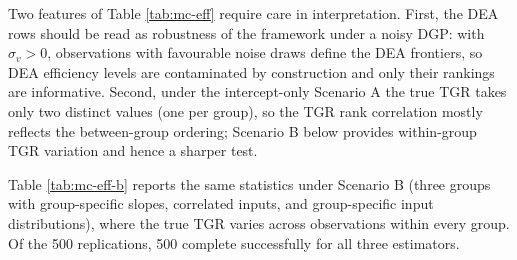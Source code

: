 \begin{table}
\centering
\caption{\label{tab:mc-eff}Efficiency recovery under Scenario A (means over 500 replications). TE is efficiency against the own-group frontier, TE* against the metafrontier, and TGR the technology gap ratio; Corr denotes the Spearman rank correlation between estimated and true values within a replication.}
\centering
{}
\end{table}

Two features of Table \ref{tab:mc-eff} require care in interpretation.
First, the DEA rows should be read as robustness of the framework under a
noisy DGP: with \(\sigma_v > 0\), observations with favourable noise draws
define the DEA frontiers, so DEA efficiency levels are contaminated by
construction and only their rankings are informative. Second, under the
intercept-only Scenario A the true TGR takes only two distinct values (one
per group), so the TGR rank correlation mostly reflects the between-group
ordering; Scenario B below provides within-group TGR variation and hence a
sharper test.

Table \ref{tab:mc-eff-b} reports the same statistics under Scenario B
(three groups with group-specific slopes, correlated inputs, and
group-specific input distributions), where the true TGR varies across
observations within every group. Of the 500 replications,
500 complete successfully for all three estimators.

